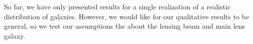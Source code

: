 So far, we have only presented results for a single realization of a realistic distribution of galaxies. However, we would like for our qualitative results to be general, so we test our assumptions the about the lensing beam and main lens galaxy.
  